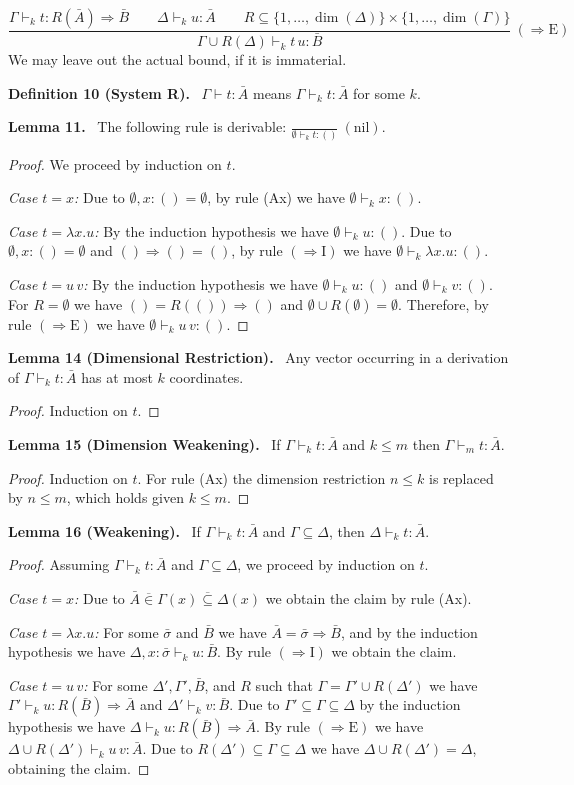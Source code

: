 \documentclass[10pt,a4paper]{article}
\newcommand{\Av}{\bar A}\newcommand{\Bv}{\bar B}\newcommand{\Cv}{\bar C}
\newcommand{\sv}{\bar\sigma}\newcommand{\tv}{\bar\tau}
\newcommand{\vsub}{\mathrel{\overline{\subseteq}}}
\newcommand{\vin}{\mathrel{\overline{\in}}}
\newcommand{\dimn}{\operatorname{dim}}
\newcommand{\pmjudgment}[3]{#1\vdash_k #2:#3}
\newcommand{\orig}[2]{\par\medskip\noindent\textbf{#1 #2.}\ }
\begin{document}
\[\frac{\pmjudgment\Gamma t{R(\Av)\Rightarrow\Bv}\qquad\pmjudgment\Delta u\Av\qquad R\subseteq\{1,\ldots,\dimn(\Delta)\}\times\{1,\ldots,\dimn(\Gamma)\}}{\pmjudgment{\Gamma\cup R(\Delta)}{t\,u}{\Bv}}\ (\Rightarrow\mathrm E)\]
We may leave out the actual bound, if it is immaterial.
\orig{Definition}{10 (System R)} $\Gamma\vdash t:\Av$ means $\pmjudgment\Gamma t\Av$ for some $k$.
\orig{Lemma}{11} The following rule is derivable: $\displaystyle\frac{}{\pmjudgment\emptyset t{()}}\ (\mathrm{nil})$.
\begin{proof}
We proceed by induction on $t$.\par
\emph{Case $t=x$:} Due to $\emptyset,x:()=\emptyset$, by rule (Ax) we have $\pmjudgment\emptyset x{()}$.\par
\emph{Case $t=\lambda x.u$:} By the induction hypothesis we have $\pmjudgment\emptyset u{()}$. Due to $\emptyset,x:()=\emptyset$ and $()\Rightarrow()=()$, by rule $(\Rightarrow\mathrm I)$ we have $\pmjudgment\emptyset{\lambda x.u}{()}$.\par
\emph{Case $t=u\,v$:} By the induction hypothesis we have $\pmjudgment\emptyset u{()}$ and $\pmjudgment\emptyset v{()}$. For $R=\emptyset$ we have $()=R(())\Rightarrow()$ and $\emptyset\cup R(\emptyset)=\emptyset$. Therefore, by rule $(\Rightarrow\mathrm E)$ we have $\pmjudgment\emptyset{u\,v}{()}$.
\end{proof}
\orig{Lemma}{14 (Dimensional Restriction)} Any vector occurring in a derivation of $\pmjudgment\Gamma t\Av$ has at most $k$ coordinates.
\begin{proof}Induction on $t$.\end{proof}
\orig{Lemma}{15 (Dimension Weakening)} If $\pmjudgment\Gamma t\Av$ and $k\leq m$ then $\Gamma\vdash_m t:\Av$.
\begin{proof}Induction on $t$. For rule (Ax) the dimension restriction $n\leq k$ is replaced by $n\leq m$, which holds given $k\leq m$.\end{proof}
\orig{Lemma}{16 (Weakening)} If $\pmjudgment\Gamma t\Av$ and $\Gamma\subseteq\Delta$, then $\pmjudgment\Delta t\Av$.
\begin{proof}
Assuming $\pmjudgment\Gamma t\Av$ and $\Gamma\subseteq\Delta$, we proceed by induction on $t$.\par
\emph{Case $t=x$:} Due to $\Av\vin\Gamma(x)\vsub\Delta(x)$ we obtain the claim by rule (Ax).\par
\emph{Case $t=\lambda x.u$:} For some $\sv$ and $\Bv$ we have $\Av=\sv\Rightarrow\Bv$, and by the induction hypothesis we have $\pmjudgment{\Delta,x:\sv}{u}{\Bv}$. By rule $(\Rightarrow\mathrm I)$ we obtain the claim.\par
\emph{Case $t=u\,v$:} For some $\Delta',\Gamma',\Bv$, and $R$ such that $\Gamma=\Gamma'\cup R(\Delta')$ we have $\pmjudgment{\Gamma'}u{R(\Bv)\Rightarrow\Av}$ and $\pmjudgment{\Delta'}v\Bv$. Due to $\Gamma'\subseteq\Gamma\subseteq\Delta$ by the induction hypothesis we have $\pmjudgment\Delta u{R(\Bv)\Rightarrow\Av}$. By rule $(\Rightarrow\mathrm E)$ we have $\pmjudgment{\Delta\cup R(\Delta')}{u\,v}{\Av}$. Due to $R(\Delta')\subseteq\Gamma\subseteq\Delta$ we have $\Delta\cup R(\Delta')=\Delta$, obtaining the claim.
\end{proof}
\end{document}

